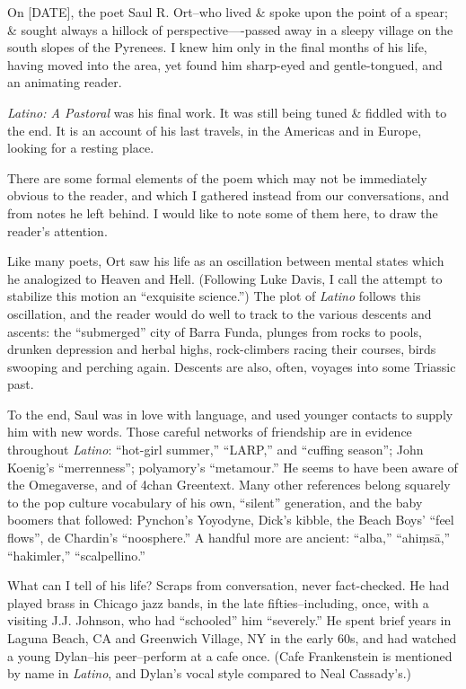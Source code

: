 On [DATE], the poet Saul R. Ort--who lived \& spoke upon the point of a spear; \& sought always a hillock of perspective—-passed away in a sleepy village on the south slopes of the Pyrenees. I knew him only in the final months of his life, having moved into the area, yet found him sharp-eyed and gentle-tongued, and an animating reader. 

\textit{Latino: A Pastoral} was his final work. It was still being tuned \& fiddled with to the end. It is an account of his last travels, in the Americas and in Europe, looking for a resting place.

There are some formal elements of the poem which may not be immediately obvious to the reader, and which I gathered instead from our conversations, and from notes he left behind. I would like to note some of them here, to draw the reader's attention. 

Like many poets, Ort saw his life as an oscillation between mental states which he analogized to Heaven and Hell. (Following Luke Davis, I call the attempt to stabilize this motion an ``exquisite science.'') The plot of \textit{Latino} follows this oscillation, and the reader would do well to track to the various descents and ascents: the ``submerged'' city of Barra Funda, plunges from rocks to pools, drunken depression and herbal highs, rock-climbers racing their courses, birds swooping and perching again. Descents are also, often, voyages into some Triassic past.

To the end, Saul was in love with language, and used younger contacts to supply him with new words. Those careful networks of friendship are in evidence throughout \textit{Latino}: ``hot-girl summer,'' ``LARP,'' and ``cuffing season''; John Koenig's ``merrenness''; polyamory's ``metamour.'' He seems to have been aware of the Omegaverse, and of 4chan Greentext. Many other references belong squarely to the pop culture vocabulary of his own, ``silent'' generation, and the baby boomers that followed: Pynchon's Yoyodyne, Dick's kibble, the Beach Boys' ``feel flows'', de Chardin's ``noosphere.'' A handful more are ancient: ``alba,'' ``ahiṃsā,'' ``hakimler,'' ``scalpellino.''

What can I tell of his life? Scraps from conversation, never fact-checked. He had played brass in Chicago jazz bands, in the late fifties--including, once, with a visiting J.J. Johnson, who had ``schooled'' him ``severely.'' He spent brief years in Laguna Beach, CA and Greenwich Village, NY in the early 60s, and had watched a young Dylan--his peer--perform at a cafe once. (Cafe Frankenstein is mentioned by name in \textit{Latino}, and Dylan's vocal style compared to Neal Cassady's.)